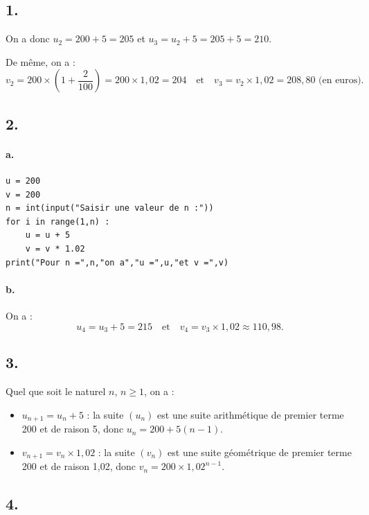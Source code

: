 \subsection*{1.}

On a donc \( u_2 = 200 + 5 = 205 \) et \( u_3 = u_2 + 5 = 205 + 5 = 210 \).

De même, on a :
\[
v_2 = 200 \times \left(1 + \dfrac{2}{100}\right) = 200 \times 1{,}02 = 204 \quad \text{et} \quad v_3 = v_2 \times 1{,}02 = 208{,}80 \text{ (en euros)}.
\]

\subsection*{2.}

\paragraph{a.}
\begin{center}
\begin{lstlisting}[style=python]
u = 200
v = 200
n = int(input("Saisir une valeur de n :"))
for i in range(1,n) :
    u = u + 5 
    v = v * 1.02
print("Pour n =",n,"on a","u =",u,"et v =",v)
\end{lstlisting}
\end{center}

\paragraph{b.} On a :
\[
u_4 = u_3 + 5 = 215 \quad \text{et} \quad v_4 = v_3 \times 1{,}02 \approx 110{,}98.
\]

\subsection*{3.}

Quel que soit le naturel \( n \), \( n \geq 1 \), on a :
\begin{itemize}
    \item \( u_{n+1} = u_n + 5 \) : la suite \( (u_n) \) est une suite arithmétique de premier terme 200 et de raison 5, donc \( u_n = 200 + 5(n - 1) \).
    \item \( v_{n+1} = v_n \times 1{,}02 \) : la suite \( (v_n) \) est une suite géométrique de premier terme 200 et de raison 1{,}02, donc \( v_n = 200 \times 1{,}02^{n-1} \).
\end{itemize}

\subsection*{4.}

